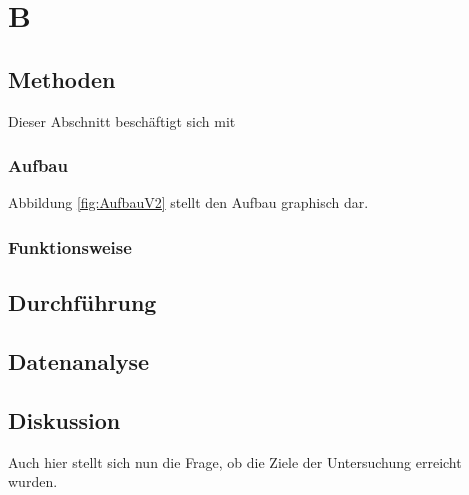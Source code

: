 \section{B}
	
	\subsection{Methoden}
		
		Dieser Abschnitt beschäftigt sich mit %
				
		\subsubsection{Aufbau}

			Abbildung \ref{fig:AufbauV2} stellt den Aufbau graphisch dar.
			
			
		\subsubsection{Funktionsweise}
			
			
	\subsection{Durchführung}
		
		 
	\subsection{Datenanalyse}
		
		
	\subsection{Diskussion}
		
		Auch hier stellt sich nun die Frage, ob die Ziele der Untersuchung erreicht wurden.
		